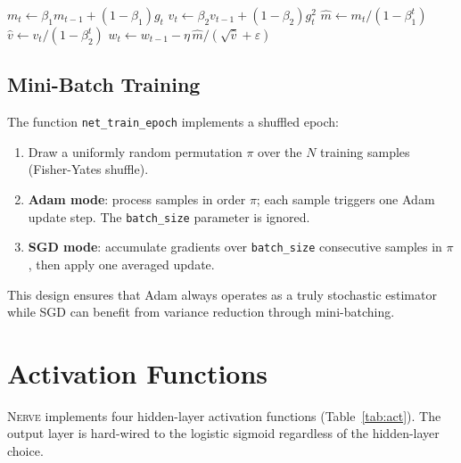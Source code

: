 \documentclass[11pt,a4paper]{article}
\newcommand{\nerve}{\textsc{Nerve}}
\begin{document}
\begin{algorithm}[H]
\caption{Adam weight update (single weight)}
\label{alg:adam}
$m_t \leftarrow \beta_1 m_{t-1} + (1-\beta_1)g_t$\;
$v_t \leftarrow \beta_2 v_{t-1} + (1-\beta_2)g_t^2$\;
$\hat{m} \leftarrow m_t / (1-\beta_1^t)$\;
$\hat{v} \leftarrow v_t / (1-\beta_2^t)$\;
$w_t \leftarrow w_{t-1} - \eta\,\hat{m} / (\sqrt{\hat{v}}+\varepsilon)$\;
\end{algorithm}

\subsection{Mini-Batch Training}

The function \texttt{net\_train\_epoch} implements a shuffled epoch:

\begin{enumerate}[leftmargin=2.4em]
  \item Draw a uniformly random permutation $\pi$ over the $N$ training samples
        (Fisher-Yates shuffle).
  \item \textbf{Adam mode}: process samples in order $\pi$; each sample
        triggers one Adam update step. The \texttt{batch\_size} parameter is
        ignored.
  \item \textbf{SGD mode}: accumulate gradients over \texttt{batch\_size}
        consecutive samples in $\pi$, then apply one averaged update.
\end{enumerate}

This design ensures that Adam always operates as a truly stochastic estimator
while SGD can benefit from variance reduction through mini-batching.

\section{Activation Functions}
\label{sec:activations}

\nerve{} implements four hidden-layer activation functions (Table~\ref{tab:act}).
The output layer is hard-wired to the logistic sigmoid regardless of the
hidden-layer choice.
\end{document}
